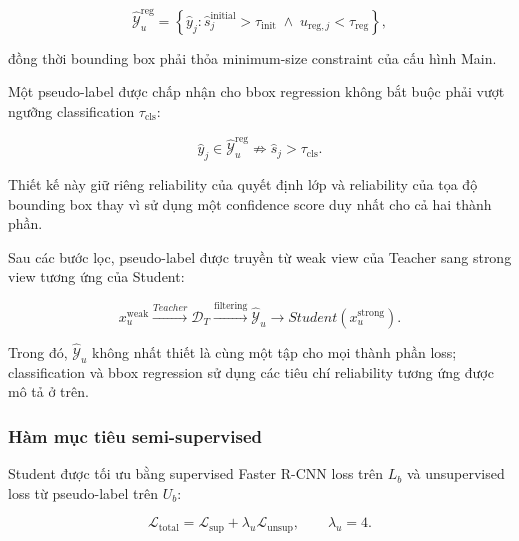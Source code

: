 \documentclass[pdflatex,sn-mathphys-num]{sn-jnl}%
\theoremstyle{thmstyleone}%
\theoremstyle{thmstyletwo}%
\theoremstyle{thmstylethree}%
\begin{document}
\begin{equation}
\widehat{\mathcal{Y}}^{\mathrm{reg}}_u
=
\left\{
\hat{y}_j:
\hat{s}^{\mathrm{initial}}_j>\tau_{\mathrm{init}}
\;\land\;
u_{\mathrm{reg},j}<\tau_{\mathrm{reg}}
\right\},
\label{eq:accepted_regression_pseudo_set}
\end{equation}

đồng thời bounding box phải thỏa minimum-size constraint của cấu hình Main.

Một pseudo-label được chấp nhận cho bbox regression không bắt buộc phải vượt
ngưỡng classification \(\tau_{\mathrm{cls}}\):

\begin{equation}
\hat{y}_j
\in
\widehat{\mathcal{Y}}^{\mathrm{reg}}_u
\not\Rightarrow
\hat{s}_j>\tau_{\mathrm{cls}}.
\label{eq:regression_not_require_cls_threshold}
\end{equation}

Thiết kế này giữ riêng reliability của quyết định lớp và reliability của
tọa độ bounding box thay vì sử dụng một confidence score duy nhất cho cả hai
thành phần.

Sau các bước lọc, pseudo-label được truyền từ weak view của Teacher sang
strong view tương ứng của Student:

\begin{equation}
x_u^{\mathrm{weak}}
\xrightarrow{Teacher}
\mathcal{D}_T
\xrightarrow{\mathrm{filtering}}
\widehat{\mathcal{Y}}_u
\longrightarrow
Student(x_u^{\mathrm{strong}}).
\label{eq:pseudo_label_generation_pipeline}
\end{equation}

Trong đó, \(\widehat{\mathcal{Y}}_u\) không nhất thiết là cùng một tập cho
mọi thành phần loss; classification và bbox regression sử dụng các tiêu chí
reliability tương ứng được mô tả ở trên.

\subsubsection{Hàm mục tiêu semi-supervised}
\label{subsubsec:ssl_training_objective}
\label{subsubsec:ssl_sampling_ratio}

Student được tối ưu bằng supervised Faster R-CNN loss trên \(L_b\) và
unsupervised loss từ pseudo-label trên \(U_b\):

\begin{equation}
\mathcal{L}_{\mathrm{total}}
=
\mathcal{L}_{\mathrm{sup}}
+
\lambda_u
\mathcal{L}_{\mathrm{unsup}},
\qquad
\lambda_u=4.
\label{eq:ssl_total_loss}
\end{equation}
\end{document}
